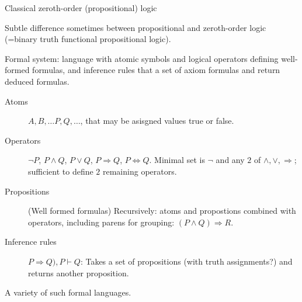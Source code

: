 \setcounter{currentlevel}{\value{baseSectionLevel}}
\label{sec:Logic}

\cite{wiki:Logic}


\label{sec:Formal_languages}

\label{sec:Proof_theory}

\label{sec:Model_theory}

\label{sec:Zeroth_order_logic}

Classical zeroth-order (propositional) 
logic~\cite{iep:Propositional_logic,
wiki:Propositional_calculus,
wiki:Zeroth_order_logic}

Subtle difference sometimes between propositional
and zeroth-order logic 
(=binary truth functional propositional logic).

Formal system:
language with atomic symbols
and logical operators defining well-formed formulas,
and inference rules that a set of axiom formulas 
and return deduced formulas.
\begin{description}
\item[Atoms]  $A, B, \ldots P, Q, \ldots$, 
that may be asisgned values \textsf{true} or \textsf{false}.

\item[Operators] $\lnot P$, $P \wedge Q$, $P \vee Q$, 
$P \Rightarrow Q$, $P \Leftrightarrow Q$. 
Minimal set is $\lnot$ and 
any $2$ of  $\wedge, \vee, \Rightarrow$;
sufficient to define $2$ remaining operators.

\item[Propositions] (Well formed formulas)
Recursively: atoms and propostions combined with operators,
including parens for grouping: $(P \wedge Q) \Rightarrow R$.

\item[Inference rules] ${P \Rightarrow Q), P} \vdash Q$:
Takes a set of propositions (with truth assignments?)
and returns another proposition.
\end{description}

A variety of such formal languages.


